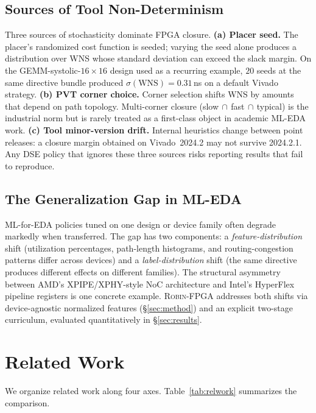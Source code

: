 \documentclass[journal]{IEEEtran}
\begin{document}
\subsection{Sources of Tool Non-Determinism}
Three sources of stochasticity dominate FPGA closure.
\textbf{(a) Placer seed.} The placer's randomized cost function is seeded; varying the seed alone produces a distribution over WNS whose standard deviation can exceed the slack margin. On the GEMM-systolic-$16{\times}16$ design used as a recurring example, $20$ seeds at the same directive bundle produced $\sigma(\mathrm{WNS}) = 0.31$\,ns on a default Vivado strategy.
\textbf{(b) PVT corner choice.} Corner selection shifts WNS by amounts that depend on path topology. Multi-corner closure (slow$\,\cap\,$fast$\,\cap\,$typical) is the industrial norm but is rarely treated as a first-class object in academic ML-EDA work.
\textbf{(c) Tool minor-version drift.} Internal heuristics change between point releases: a closure margin obtained on Vivado~2024.2 may not survive 2024.2.1. Any DSE policy that ignores these three sources risks reporting results that fail to reproduce.

\subsection{The Generalization Gap in ML-EDA}
ML-for-EDA policies tuned on one design or device family often degrade markedly when transferred. The gap has two components: a \emph{feature-distribution} shift (utilization percentages, path-length histograms, and routing-congestion patterns differ across devices) and a \emph{label-distribution} shift (the same directive produces different effects on different families). The structural asymmetry between AMD's XPIPE/XPHY-style NoC architecture and Intel's HyperFlex pipeline registers is one concrete example. \textsc{Robin-FPGA} addresses both shifts via device-agnostic normalized features (\S\ref{sec:method}) and an explicit two-stage curriculum, evaluated quantitatively in \S\ref{sec:results}.

\section{Related Work}
\label{sec:related}

We organize related work along four axes. Table~\ref{tab:relwork} summarizes the comparison.
\end{document}
